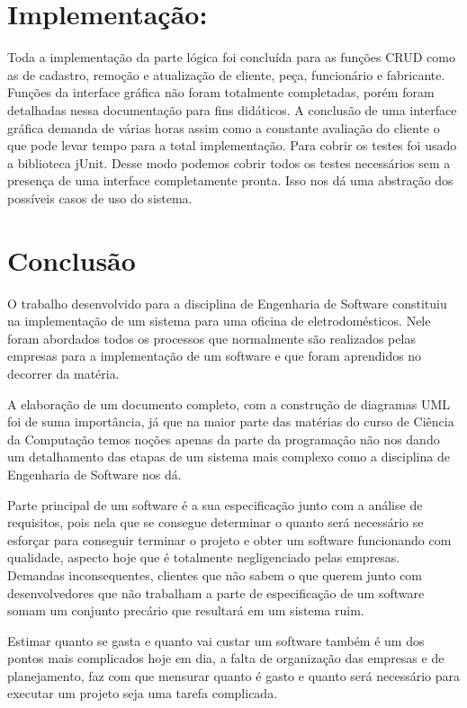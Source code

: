 \documentclass[a4paper,10pt]{article}
\begin{document}
\section{Implementação:}


Toda a implementação da parte lógica foi concluída para as funções CRUD como as de cadastro, remoção e atualização de cliente, peça, funcionário e fabricante. Funções da interface gráfica não foram totalmente completadas, porém foram detalhadas nessa documentação para fins didáticos. A conclusão de uma interface gráfica demanda de várias horas assim como a constante avaliação do cliente o que pode levar tempo para a total implementação. Para cobrir os testes foi usado a biblioteca jUnit. Desse modo podemos cobrir todos os testes necessários sem a presença de uma interface completamente pronta. Isso nos dá uma abstração dos possíveis casos de uso do sistema.

\section{Conclusão}

O trabalho desenvolvido para a disciplina de Engenharia de Software constituiu na implementação de um sistema para uma oficina de eletrodomésticos. Nele foram abordados todos os processos que normalmente são realizados pelas empresas para a implementação de um software e que foram aprendidos no decorrer da matéria. 

A elaboração de um documento completo, com a construção de diagramas UML foi de suma importância, já que na maior parte das matérias do curso de Ciência da Computação temos noções apenas da parte da programação não nos dando um detalhamento das etapas de um sistema mais complexo como a disciplina de Engenharia de Software nos dá. 

Parte principal de um software é a sua especificação junto com a análise de requisitos, pois nela que se consegue determinar o quanto será necessário se esforçar para conseguir terminar o projeto e obter um software funcionando com qualidade, aspecto hoje que é totalmente negligenciado pelas empresas. Demandas inconsequentes, clientes que não sabem o que querem junto com desenvolvedores que não trabalham a parte de especificação de um software somam um conjunto precário que resultará em um sistema ruim. 

Estimar quanto se gasta e quanto vai custar um software também é um dos pontos mais complicados hoje em dia, a falta de organização das empresas e de planejamento, faz com que mensurar quanto é gasto e quanto será necessário para executar um projeto seja uma tarefa complicada. 
\end{document}
